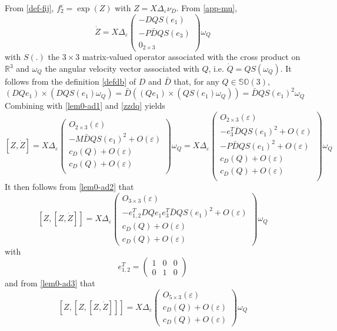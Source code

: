 \documentclass[a4paper,twoside]{article}
\def \RR {{\mathbb R}}
\def \eps {\varepsilon}
\def \SO {{\mathbb S}{\mathbb O}}
\begin{document}
From \eqref{def-fij},  $f_2^\eps= \exp(Z)$ with $Z= X \Delta_\eps \nu_D$.
From \eqref{app-mu},
\begin{equation}
\label{zzdq}
 \dot Z = X \Delta_\eps 
\begin{pmatrix}
- D Q S(e_1)\\
-P\bar D Q S(e_3) \\
0_{2\times 3} 
\end{pmatrix} \omega_Q
\end{equation}
with $S(.)$ the $3 \times 3$ matrix-valued operator associated with the cross product on $\RR^3$ and $\omega_Q$ the angular velocity 
vector associated with $Q$, i.e. $\dot Q = Q S(\omega_Q)$. It follows from the definition \eqref{defdb} of $D$ and 
$\bar D$ that, for any $Q \in \SO(3)$, 
\[
(DQ e_1) \times (DQS(e_1)\omega_Q)= \bar D ((Q e_1) \times (QS(e_1)\omega_Q))= \bar D Q S(e_1)^2\omega_Q
\] 
Combining with \eqref{lem0-ad1} and \eqref{zzdq} yields
\[
[Z, \dot Z] = 
X \Delta_\eps
\begin{pmatrix}
O_{2\times 3}(\eps) \\
- M \bar D Q S(e_1)^2 + O(\eps) \\
c_{D}(Q)+ O(\eps) \\
c_{D}(Q)+ O(\eps) \\
\end{pmatrix}
 \omega_Q 
=
X \Delta_\eps
\begin{pmatrix}
O_{2 \times 3}(\eps) \\
- e_3^T \bar D Q S(e_1)^2 + O(\eps) \\
- P \bar D Q S(e_1)^2 +O(\eps) \\
c_{D}(Q)+ O(\eps) \\
c_{D}(Q)+ O(\eps) \\
\end{pmatrix}
 \omega_Q 
\]
It then follows from \eqref{lem0-ad2} that 
\[
 [Z,[Z, \dot Z]]= X \Delta_\eps 
\begin{pmatrix}
O_{3\times 3}(\eps) \\
-  e_{1,2}^T D Q e_1 e_3^T \bar D Q S(e_1)^2 + O(\eps) \\
c_{D}(Q)+ O(\eps) \\
c_{D}(Q)+ O(\eps)
\end{pmatrix}
\omega_Q 
\]
with
\[
e_{1,2}^T = \begin{pmatrix}
1 & 0 & 0 \\
0 & 1 & 0
\end{pmatrix}
\]
and from \eqref{lem0-ad3}  that 
\[
 [Z,[Z,[Z, \dot Z]]] = X \Delta_\eps 
\begin{pmatrix}
O_{5\times 3}(\eps) \\
c_{D}(Q)+ O(\eps) \\
c_{D}(Q)+ O(\eps)
\end{pmatrix}
\omega_Q 
\]
\end{document}
